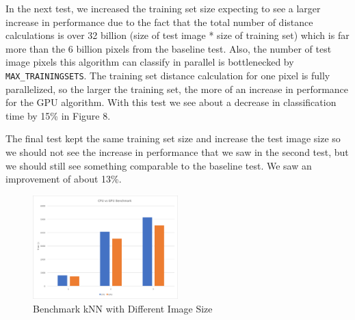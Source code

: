\documentclass[conference]{IEEEtran}
\begin{document}
In the next test, we increased the training set size expecting to see a larger increase in performance due to the fact that the total number of distance calculations is over 32 billion (size of test image * size of training set) which is far more than the 6 billion pixels from the baseline test. Also, the number of test image pixels this algorithm can classify in parallel is bottlenecked by \verb|MAX_TRAININGSETS|. The training set distance calculation for one pixel is fully parallelized, so the larger the training set, the more of an increase in performance for the GPU algorithm. With this test we see about a decrease in classification time by 15\% in Figure 8.

The final test kept the same training set size and increase the test image size so we should not see the increase in performance that we saw in the second test, but we should still see something comparable to the baseline test. We saw an improvement of about 13\%.

\begin{figure}[h]
\centering
\includegraphics[width=0.5\textwidth]{bench}
\caption{Benchmark kNN with Different Image Size}
\end{figure}


%
%
\end{document}
